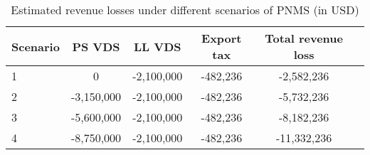 \begin{table}[htbp] \centering
\caption{Estimated revenue losses under different scenarios of PNMS (in USD)}
\label{tab:revenue_loss}

\begin{tabular}{l*{5}c}

\hline
\hline
Scenario	&	PS VDS	&	LL VDS	&	Export tax	&	Total revenue loss	\\
\hline
	1	&	0	&	-2,100,000	&	-482,236	&	-2,582,236	\\
	2	&	-3,150,000	&	-2,100,000	&	-482,236	&	-5,732,236	\\
	3	&	-5,600,000	&	-2,100,000	&	-482,236	&	-8,182,236	\\
	4	&	-8,750,000	&	-2,100,000	&	-482,236	&	-11,332,236	\\
	\hline
	\hline
\end{tabular}
\end{table}
